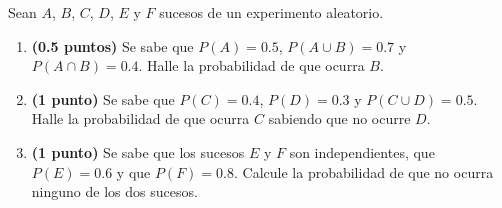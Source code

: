 
Sean $A$, $B$, $C$, $D$, $E$ y $F$ sucesos de un experimento aleatorio.
\begin{enumerate}[label=\alph*)]
\item \textbf{(0.5 puntos)} Se sabe que $P(A)=0.5$, $P(A\cup B)=0.7$ y $P(A\cap B)=0.4$. Halle la probabilidad de que ocurra $B$.
\item \textbf{(1 punto)} Se sabe que $P(C)=0.4$, $P(D)=0.3$ y $P(C\cup D)=0.5$. Halle la probabilidad de que ocurra $C$ sabiendo que no ocurre $D$.
\item \textbf{(1 punto)} Se sabe que los sucesos $E$ y $F$ son independientes, que $P(E)=0.6$ y que $P(F)=0.8$. Calcule la probabilidad de que no ocurra ninguno de los dos sucesos.
\end{enumerate}
